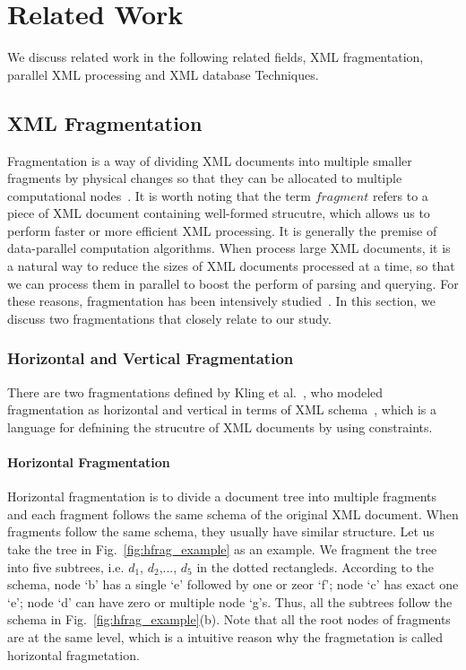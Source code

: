 

\chapter{Related Work} \label{sec:relatedwork}

We discuss related work in the following related fields, XML fragmentation,
parallel XML processing and XML database Techniques.

\section{XML Fragmentation}

Fragmentation is a way of dividing XML documents into multiple smaller fragments
by physical changes so that they can be allocated to multiple computational
nodes~\cite{BrMa14}. It is worth noting that the term $fragment$ refers to a
piece of XML document containing well-formed strucutre, which allows us to
perform faster or more efficient XML processing. It is generally the premise of
data-parallel computation algorithms. When process large XML documents, it is a
natural way to reduce the sizes of XML documents processed at a time, so that we
can process them in parallel to boost the perform of parsing and querying. For
these reasons, fragmentation has been intensively studied~\cite{ARBM06,DaGP14,
	CFKL12,NEMH07, OgTP13,LiZZ17, CFKL12,DaGP14}. In this section, we discuss 
two fragmentations that closely relate to our study.


\subsection{Horizontal and Vertical Fragmentation}
\label{sec:hfragment}

There are two fragmentations defined by Kling et
al.~\cite{kling11:dist_xml}, who modeled fragmentation as horizontal and
vertical in terms of XML schema~\cite{schema}, which is a language for defnining
the strucutre of XML documents by using constraints.

\subsubsection{Horizontal Fragmentation}
\label{sec:vfragment}

Horizontal fragmentation is to divide a document tree into multiple fragments
and each fragment follows the same schema of the original XML document. When
fragments follow the same schema, they usually have similar structure.  Let us
take the tree in Fig.~\ref{fig:hfrag_example} as an example. We fragment the
tree into five subtrees, i.e. $d_1$, $d_2$,..., $d_5$ in the dotted rectangleds.
According to the schema, node `b' has a single `e' followed by one or zeor  `f';
node `c' has exact one `e'; node `d' can have zero or multiple node `g's. Thus,
all the subtrees follow the schema in Fig.~\ref{fig:hfrag_example}(b). Note that
all the root nodes of fragments are at the same level, which is a intuitive 
reason why the fragmetation is called horizontal fragmetation.


